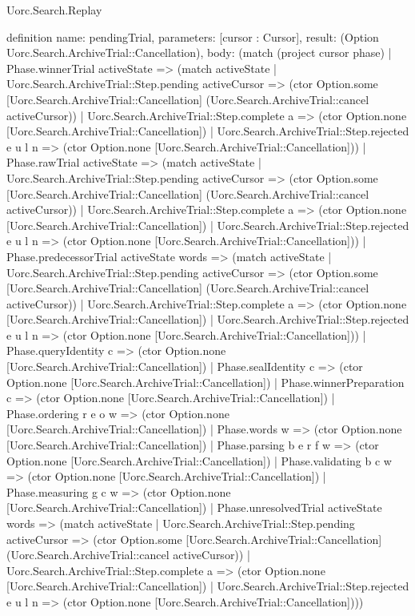 \begin{lexlean}{Uorc.Search.Replay}
\begin{semanticmodule}
definition{
  name: pendingTrial,
  parameters: [cursor : Cursor],
  result: (Option Uorc.Search.ArchiveTrial::Cancellation),
  body: (match (project cursor phase)
    | Phase.winnerTrial activeState => (match activeState
      | Uorc.Search.ArchiveTrial::Step.pending activeCursor => (ctor Option.some [Uorc.Search.ArchiveTrial::Cancellation] (Uorc.Search.ArchiveTrial::cancel activeCursor))
      | Uorc.Search.ArchiveTrial::Step.complete a => (ctor Option.none [Uorc.Search.ArchiveTrial::Cancellation])
      | Uorc.Search.ArchiveTrial::Step.rejected e u l n => (ctor Option.none [Uorc.Search.ArchiveTrial::Cancellation]))
    | Phase.rawTrial activeState => (match activeState
      | Uorc.Search.ArchiveTrial::Step.pending activeCursor => (ctor Option.some [Uorc.Search.ArchiveTrial::Cancellation] (Uorc.Search.ArchiveTrial::cancel activeCursor))
      | Uorc.Search.ArchiveTrial::Step.complete a => (ctor Option.none [Uorc.Search.ArchiveTrial::Cancellation])
      | Uorc.Search.ArchiveTrial::Step.rejected e u l n => (ctor Option.none [Uorc.Search.ArchiveTrial::Cancellation]))
    | Phase.predecessorTrial activeState words => (match activeState
      | Uorc.Search.ArchiveTrial::Step.pending activeCursor => (ctor Option.some [Uorc.Search.ArchiveTrial::Cancellation] (Uorc.Search.ArchiveTrial::cancel activeCursor))
      | Uorc.Search.ArchiveTrial::Step.complete a => (ctor Option.none [Uorc.Search.ArchiveTrial::Cancellation])
      | Uorc.Search.ArchiveTrial::Step.rejected e u l n => (ctor Option.none [Uorc.Search.ArchiveTrial::Cancellation]))
    | Phase.queryIdentity c => (ctor Option.none [Uorc.Search.ArchiveTrial::Cancellation])
    | Phase.sealIdentity c => (ctor Option.none [Uorc.Search.ArchiveTrial::Cancellation])
    | Phase.winnerPreparation c => (ctor Option.none [Uorc.Search.ArchiveTrial::Cancellation])
    | Phase.ordering r e o w => (ctor Option.none [Uorc.Search.ArchiveTrial::Cancellation])
    | Phase.words w => (ctor Option.none [Uorc.Search.ArchiveTrial::Cancellation])
    | Phase.parsing b e r f w => (ctor Option.none [Uorc.Search.ArchiveTrial::Cancellation])
    | Phase.validating b c w => (ctor Option.none [Uorc.Search.ArchiveTrial::Cancellation])
    | Phase.measuring g c w => (ctor Option.none [Uorc.Search.ArchiveTrial::Cancellation])
    | Phase.unresolvedTrial activeState words => (match activeState
      | Uorc.Search.ArchiveTrial::Step.pending activeCursor => (ctor Option.some [Uorc.Search.ArchiveTrial::Cancellation] (Uorc.Search.ArchiveTrial::cancel activeCursor))
      | Uorc.Search.ArchiveTrial::Step.complete a => (ctor Option.none [Uorc.Search.ArchiveTrial::Cancellation])
      | Uorc.Search.ArchiveTrial::Step.rejected e u l n => (ctor Option.none [Uorc.Search.ArchiveTrial::Cancellation])))
}


\end{semanticmodule}
\end{lexlean}
